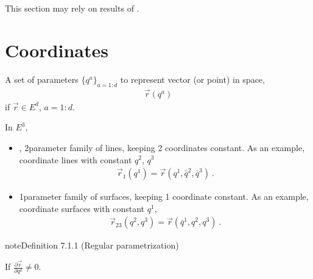 \documentclass[letterpaper,10pt,english]{jupyterBook}
\begin{document}
\sphinxAtStartPar
This section may rely on results of {\hyperref[\detokenize{ch/differential-geometry/intro:differential-geometry-intro}]{}}.


\section{Coordinates}
\label{\detokenize{ch/tensor-algebra-calculus/calculus-euclidean:coordinates}}\label{\detokenize{ch/tensor-algebra-calculus/calculus-euclidean:tensor-calculus-coordinates}}
\sphinxAtStartPar
A set of parameters \(\{q^a\}_{a=1:d}\) to represent vector (or point) in space,
\begin{equation*}
\begin{split}\vec{r}(q^a)\end{split}
\end{equation*}
\sphinxAtStartPar
if \(\vec{r} \in E^{d}\), \(a=1:d\).

\sphinxAtStartPar
In \(E^3\),
\begin{itemize}
\item {} 
\sphinxAtStartPar
{}, 2\sphinxhyphen{}parameter family of lines, keeping 2 coordinates constant. As an example, coordinate lines with constant \(q^2, \, q^3\)
\begin{equation*}
\begin{split}\vec{r}_1(q^1) = \vec{r}(q^1, \bar{q}^2, \bar{q}^3) \ .\end{split}
\end{equation*}
\item {} 
\sphinxAtStartPar
{} 1\sphinxhyphen{}parameter family of surfaces, keeping 1 coordinate constant. As an example, coordinate surfaces with constant \(q^1\),
\begin{equation*}
\begin{split}\vec{r}_{23}(q^2, q^3) = \vec{r}(\bar{q}^1, q^2, q^3) \ .\end{split}
\end{equation*}
\end{itemize}
\label{ch/tensor-algebra-calculus/calculus-euclidean:definition-0}
\begin{sphinxadmonition}{note}{Definition 7.1.1 (Regular parametrization)}



\sphinxAtStartPar
If \(\frac{\partial \vec{r}}{\partial q^a} \ne 0\).
\end{sphinxadmonition}
\end{document}
